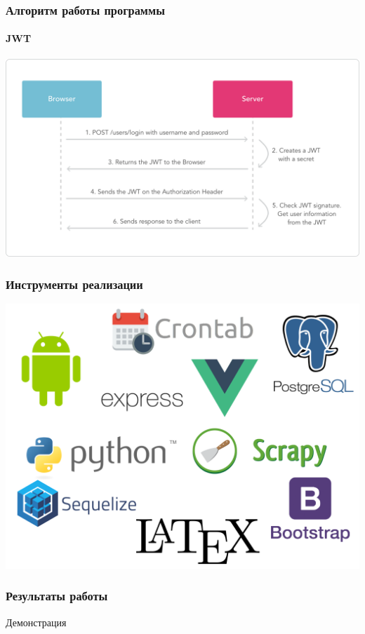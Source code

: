\documentclass{beamer}
\begin{document}
\begin{frame}
    \frametitle{Алгоритм работы программы}
    \framesubtitle{JWT}
    \begin{center}
      \includegraphics[width=\linewidth]{jwt-diagram}
    \end{center} 
    \begin{flushright}
      {\tiny \cite{jwt}}
    \end{flushright}
\end{frame}


\begin{frame}
    \frametitle{Инструменты реализации}
    \begin{center}
      \includegraphics[width=0.9\columnwidth]{logos.png}
    \end{center} 
\end{frame}

\begin{frame}[c]
    \frametitle{Результаты работы}
    \begin{center}
        Демонстрация
    \end{center}
\end{frame}
\end{document}
